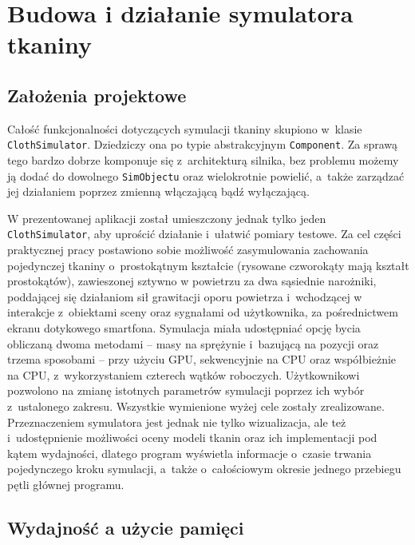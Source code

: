 \chapter{Budowa i działanie symulatora tkaniny}
\label{t:symulacja}

	\section{Założenia projektowe}
	\label{t:symulacja:zalozenia}
	
	
	Całość funkcjonalności dotyczących symulacji tkaniny skupiono w~klasie \texttt{ClothSimulator}. Dziedziczy ona po typie abstrakcyjnym \texttt{Component}. Za sprawą tego bardzo dobrze komponuje się z~architekturą silnika, bez problemu możemy ją dodać do dowolnego \texttt{SimObjectu} oraz wielokrotnie powielić, a~także zarządzać jej działaniem poprzez zmienną włączającą bądź wyłączającą.
	
	W prezentowanej aplikacji został umieszczony jednak tylko jeden \texttt{ClothSimulator}, aby uprościć działanie i~ułatwić pomiary testowe. Za cel części praktycznej pracy postawiono sobie możliwość zasymulowania zachowania pojedynczej tkaniny o~prostokątnym kształcie (rysowane czworokąty mają kształt prostokątów), zawieszonej sztywno w powietrzu za dwa sąsiednie narożniki, poddającej się działaniom sił grawitacji oporu powietrza i~wchodzącej w interakcje z~obiektami sceny oraz sygnałami od użytkownika, za pośrednictwem ekranu dotykowego smartfona. Symulacja miała udostępniać opcję bycia obliczaną dwoma metodami -- masy na sprężynie i~bazującą na pozycji oraz trzema sposobami -- przy użyciu GPU, sekwencyjnie na CPU oraz współbieżnie na CPU, z~wykorzystaniem czterech wątków roboczych. Użytkownikowi pozwolono na zmianę istotnych parametrów symulacji poprzez ich wybór z~ustalonego zakresu. Wszystkie wymienione wyżej cele zostały zrealizowane. Przeznaczeniem symulatora jest jednak nie tylko wizualizacja, ale też i~udostępnienie możliwości oceny modeli tkanin oraz ich implementacji pod kątem wydajności, dlatego program wyświetla informacje o~czasie trwania pojedynczego kroku symulacji, a~także o~całościowym okresie jednego przebiegu pętli głównej programu. 
	
	\section{Wydajność a użycie pamięci}
	\label{t:symulacja:wydajnoscpamiec}
	
